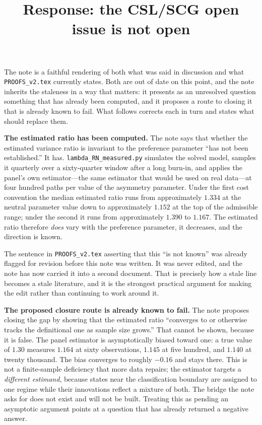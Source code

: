 \documentclass[11pt]{article}
\title{Response: the CSL/SCG open issue is not open}
\date{}
\begin{document}
\maketitle
\thispagestyle{empty}

\noindent
The note is a faithful rendering of both what was said in discussion and
what \texttt{PROOFS\_v2.tex} currently states. Both are out of date on
this point, and the note inherits the staleness in a way that matters:
it presents as an unresolved question something that has already been
computed, and it proposes a route to closing it that is already known to
fail. What follows corrects each in turn and states what should replace
them.

\bigskip
\noindent\textbf{The estimated ratio has been computed.}
The note says that whether the estimated variance ratio is invariant to
the preference parameter ``has not been established.'' It has.
\texttt{lambda\_RN\_measured.py} simulates the solved model, samples it
quarterly over a sixty-quarter window after a long burn-in, and applies
the panel's own estimator---the same estimator that would be used on real
data---at four hundred paths per value of the asymmetry parameter. Under
the first cost convention the median estimated ratio runs from
approximately $1.334$ at the neutral parameter value down to
approximately $1.152$ at the top of the admissible range; under the second
it runs from approximately $1.390$ to $1.167$. The estimated ratio
therefore \emph{does} vary with the preference parameter, it decreases,
and the direction is known.

The sentence in \texttt{PROOFS\_v2.tex} asserting that this ``is not
known'' was already flagged for revision before this note was written. It
was never edited, and the note has now carried it into a second document.
That is precisely how a stale line becomes a stale literature, and it is
the strongest practical argument for making the edit rather than
continuing to work around it.

\bigskip
\noindent\textbf{The proposed closure route is already known to fail.}
The note proposes closing the gap by showing that the estimated ratio
``converges to or otherwise tracks the definitional one as sample size
grows.'' That cannot be shown, because it is false. The panel estimator is
asymptotically biased toward one: a true value of $1.30$ measures $1.164$
at sixty observations, $1.145$ at five hundred, and $1.140$ at twenty
thousand. The bias converges to roughly $-0.16$ and stays there. This is
not a finite-sample deficiency that more data repairs; the estimator
targets a \emph{different estimand}, because states near the
classification boundary are assigned to one regime while their innovations
reflect a mixture of both. The bridge the note asks for does not exist and
will not be built. Treating this as pending an asymptotic argument points
at a question that has already returned a negative answer.
\end{document}
